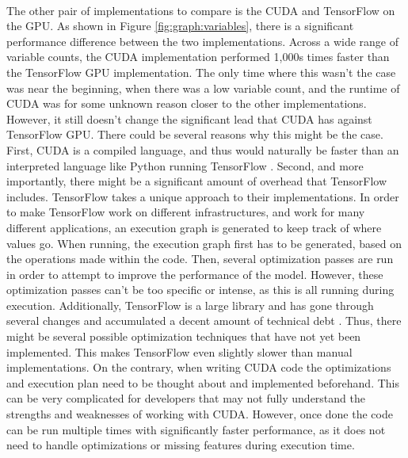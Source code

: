 \documentclass[12pt]{article}
\begin{document}
\paragraph{} %
The other pair of implementations to compare is the CUDA and TensorFlow on the GPU.
As shown in Figure \ref{fig:graph:variables}, there is a significant performance difference between the two implementations.
Across a wide range of variable counts, the CUDA implementation performed 1,000s times faster than the TensorFlow GPU implementation.
The only time where this wasn't the case was near the beginning, when there was a low variable count, and the runtime of CUDA was for some unknown reason closer to the other implementations.
However, it still doesn't change the significant lead that CUDA has against TensorFlow GPU.
There could be several reasons why this might be the case.
First, CUDA is a compiled language, and thus would naturally be faster than an interpreted language like Python running TensorFlow \cite{article_compiled_interpreted_hybrid_languages}.
Second, and more importantly, there might be a significant amount of overhead that TensorFlow includes.
TensorFlow takes a unique approach to their implementations. In order to make TensorFlow work on different infrastructures, and work for many different applications, an execution graph is generated to keep track of where values go.
When running, the execution graph first has to be generated, based on the operations made within the code.
Then, several optimization passes are run in order to attempt to improve the performance of the model.
However, these optimization passes can't be too specific or intense, as this is all running during execution.
Additionally, TensorFlow is a large library and has gone through several changes and accumulated a decent amount of technical debt \cite{article_deep_learning_framework_debt}.
Thus, there might be several possible optimization techniques that have not yet been implemented.
This makes TensorFlow even slightly slower than manual implementations.
On the contrary, when writing CUDA code the optimizations and execution plan need to be thought about and implemented beforehand.
This can be very complicated for developers that may not fully understand the strengths and weaknesses of working with CUDA.
However, once done the code can be run multiple times with significantly faster performance, as it does not need to handle optimizations or missing features during execution time.
\end{document}
